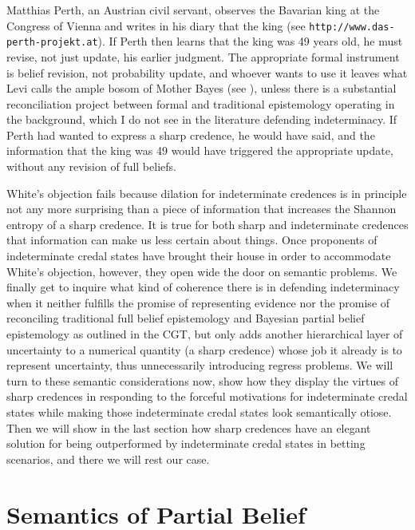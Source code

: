 \documentclass[11pt]{article}
\begin{document}
Matthias Perth, an Austrian civil servant, observes the Bavarian king
at the Congress of Vienna and writes in his diary that the king
 (see
\texttt{http://www.das-perth-projekt.at}). If Perth then learns that
the king was 49 years old, he must revise, not just update, his
earlier judgment. The appropriate formal instrument is belief
revision, not probability update, and whoever wants to use it leaves
what Levi calls the ample bosom of Mother Bayes (see
), unless there is a substantial reconciliation
project between formal and traditional epistemology operating in the
background, which I do not see in the literature defending
indeterminacy. If Perth had wanted to express a sharp credence, he
would have said,  and the information that the king was 49 would have triggered
the appropriate update, without any revision of full beliefs.

White's objection fails because dilation for indeterminate credences
is in principle not any more surprising than a piece of information
that increases the Shannon entropy of a sharp credence. It is true for
both sharp and indeterminate credences that information can make us
less certain about things. Once proponents of indeterminate credal
states have brought their house in order to accommodate White's
objection, however, they open wide the door on semantic problems. We
finally get to inquire what kind of coherence there is in defending
indeterminacy when it neither fulfills the promise of representing
evidence nor the promise of reconciling traditional full belief
 epistemology and Bayesian partial belief
epistemology as outlined in the CGT, but only adds another
hierarchical layer of uncertainty to a numerical quantity (a sharp
credence) whose job it already is to represent uncertainty, thus
unnecessarily introducing regress problems. We will turn to these
semantic considerations now, show how they display the virtues of
sharp credences in responding to the forceful motivations for
indeterminate credal states while making those indeterminate credal
states look semantically otiose. Then we will show in the last section
how sharp credences have an elegant solution for being outperformed by
indeterminate credal states in betting scenarios, and there we will
rest our case.

\section{Semantics of Partial Belief} 
\label{SemanticsOfPartialBelief}
\end{document}
